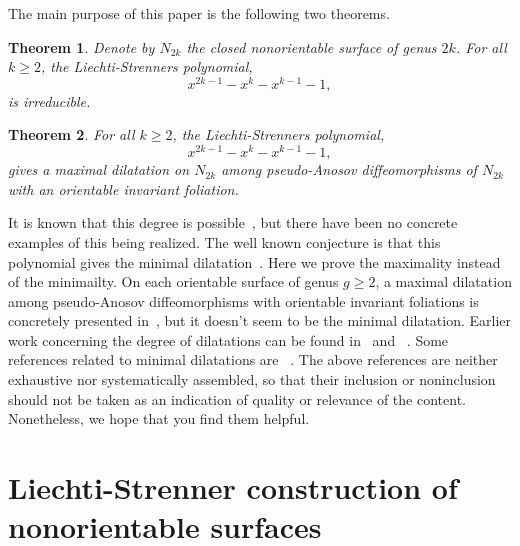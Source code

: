 \documentclass{amsart}
\newtheorem{thm}{Theorem}[section]
\theoremstyle{definition}
\theoremstyle{remark}
\begin{document}
The main purpose of this paper is the following two theorems.

\begin{thm} \label{thm:irr}
Denote by $N_{2k}$ the closed nonorientable surface of genus $2k$. 
For all $k \geq 2$, the Liechti-Strenner\textquotesingle s polynomial,
$$ x^{2k-1}-x^k-x^{k-1}-1,$$ is irreducible.
\end{thm}

\begin{thm} \label{thm:main}
For all $k \geq 2$, the Liechti-Strenner\textquotesingle s polynomial,
$$ x^{2k-1}-x^k-x^{k-1}-1,$$ gives a maximal dilatation on $N_{2k}$ among pseudo-Anosov diffeomorphisms of $N_{2k}$ with an orientable invariant foliation.
\end{thm}




 It is known that this degree is possible~\cite{Strenner17}, but there have been no concrete examples of this being realized. The well known conjecture is that this polynomial gives the minimal dilatation~\cite{LiechtiStrenner18}. Here we prove the maximality instead of the minimailty. On each orientable surface of genus $g \geq 2$, a maximal dilatation among pseudo-Anosov diffeomorphisms with orientable invariant foliations is concretely presented in~\cite{LanneauLiechti24,Shin16}, but it doesn't seem to be the minimal dilatation. Earlier work concerning the degree of dilatations can be found in~\cite{ArnouxYoccoz81} and ~\cite{Long85}.
Some references related to minimal dilatations are ~\cite{Abikoff80,AaberDunfield10,Bauer92,BestvinaHandel95,Birman74,Brinkmann00,Brinkmann04,ChoHam08,FarbMargalit12,FarberReinosoWang24,FLP79,Ham06,HamSong07,Hironaka10,HironakaKin06,KinTakasawa13,HironakaTsang24,Leininger04,LanneauThiffeault11,LanneauThiffeault11b,LiechtiStrenner18,LiechtiStrenner21,ErwanLivioCheuk25,Loving19,McMullen15,PapadopoulosPenner87,SnapPy,SongKoLos02,Tsai09,TsangZeng24,Valdivia12,Venzke08,Yazdi20,Zhirov95}.
The above references are neither exhaustive nor systematically assembled, so that their inclusion or noninclusion should not be taken as an indication of quality or relevance of the content. Nonetheless, we hope that you find them helpful.

\section{Liechti-Strenner construction of nonorientable surfaces} \label{section:LS}
\end{document}
